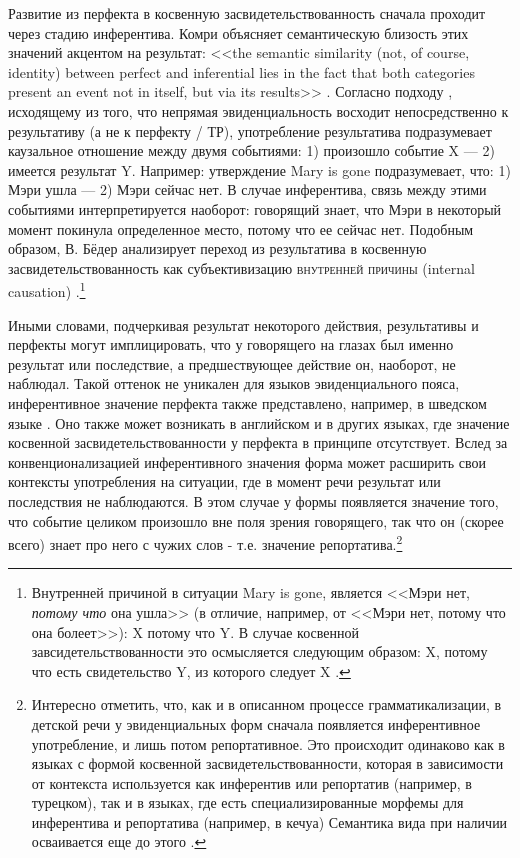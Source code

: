 Развитие из перфекта в косвенную засвидетельствованность сначала проходит через стадию инферентива. Комри объясняет семантическую близость этих значений акцентом на результат: <<the semantic similarity (not, of course, identity) between perfect and inferential lies in the fact that both categories present an event not in itself, but via its results>> \citep[110]{comrie1976}. Согласно подходу \citep[96]{bybee1994}, исходящему из того, что непрямая эвиденциальность восходит непосредственно к результативу (а не к перфекту / ТР), употребление результатива подразумевает каузальное отношение между двумя событиями: 1) произошло событие X --- 2) имеется результат Y. Например: утверждение Mary is gone подразумевает, что: 1) Мэри ушла --- 2) Мэри сейчас нет. В случае инферентива, связь между этими событиями интерпретируется наоборот: говорящий знает, что Мэри в некоторый момент покинула определенное место, потому что ее сейчас нет. Подобным образом, В. Бёдер анализирует переход из результатива в косвенную засвидетельствованность как субъективизацию \textsc{внутренней причины} (internal causation) \citep[310--312]{boeder2000}.\footnote{Внутренней причиной в ситуации Mary is gone, является <<Мэри нет, \textit{потому что} она ушла>> (в отличие, например, от <<Мэри нет, потому что она болеет>>): X потому что Y. В случае косвенной завсидетельствованности это осмысляется следующим образом: X, потому что есть свидетельство Y, из которого следует X \citep[311]{boeder2000}.}
\par Иными словами, подчеркивая результат некоторого действия, результативы и перфекты могут имплицировать, что у говорящего на глазах был именно результат или последствие, а предшествующее действие он, наоборот, не наблюдал. Такой оттенок не уникален для языков эвиденциального пояса, инферентивное значение перфекта также представлено, например, в шведском языке \citep[152--153]{dahl1985}. Оно также может возникать в английском и в других языках, где значение косвенной засвидетельствованности у перфекта в принципе отсутствует. Вслед за конвенционализацией инферентивного значения форма может расширить свои контексты употребления на ситуации, где в момент речи результат или последствия не наблюдаются. В этом случае у формы появляется значение того, что событие целиком произошло вне поля зрения говорящего, так что он (скорее всего) знает про него с чужих слов -  т.е. значение репортатива.\footnote{Интересно отметить, что, как и в описанном процессе грамматикализации, в детской речи у эвиденциальных форм сначала появляется инферентивное употребление, и лишь потом репортативное. Это происходит одинаково как в языках с формой косвенной засвидетельствованности, которая в зависимости от контекста используется как инферентив или репортатив (например, в турецком), так и в языках, где есть специализированные морфемы для инферентива и репортатива (например, в кечуа) \citep[191]{fitneva2018} Семантика вида при наличии осваивается еще до этого \citep[194--195]{aksu88}.}
